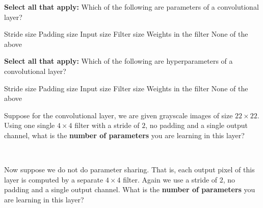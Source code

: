 \documentclass[11pt,addpoints,answers]{exam}
\newcommand{\sall}{\textbf{Select all that apply: }}
\begin{document}
\begin{questions}
\begin{parts}
\begin{subparts}
    \subpart[1] \sall Which of the following are parameters of a convolutional layer?
    \checkboxchar{$\Box$} \checkedchar{$\blacksquare$}
    \begin{checkboxes}
        \choice Stride size
        \choice Padding size
        \choice Input size
        \choice Filter size
        \choice Weights in the filter
        \choice None of the above
    \end{checkboxes}
    
    \vspace{4mm}
    
    \subpart[1] \sall Which of the following are hyperparameters of a convolutional layer?
    \checkboxchar{$\Box$} \checkedchar{$\blacksquare$}
    \begin{checkboxes}
        \choice Stride size
        \choice Padding size
        \choice Input size
        \choice Filter size
        \choice Weights in the filter
        \choice None of the above
    \end{checkboxes}
    
    \vspace{4mm}

    \subpart[1] Suppose for the convolutional layer, we are given grayscale images of size $22\times 22$. Using one single $4 \times 4$ filter with a stride of $2$, no padding and a single output channel, what is the \textbf{number of parameters} you are learning in this layer? \\
    \begin{your_solution}[height=2cm,width=4cm]
    \end{your_solution}\\
    
    \vspace{4mm}
    
    \subpart[1] Now suppose we do not do parameter sharing. That is, each output pixel of this layer is computed by a separate $4 \times 4$ filter. Again we use a stride of $2$, no padding and a single output channel. What is the \textbf{number of parameters} you are learning in this layer? \\
    \begin{your_solution}[height=2cm,width=4cm]
    \end{your_solution}


\end{subparts}
\end{parts}
\end{questions}
\end{document}
